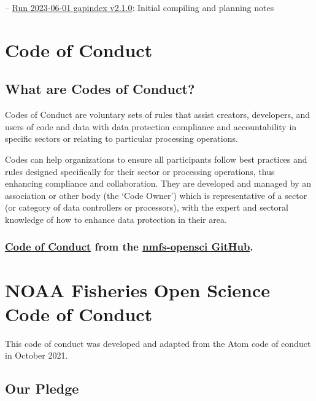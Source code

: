\documentclass[
  letterpaper,
  oneside,
  open=any]{scrbook}
\begin{document}
--
\href{https://raw.githubusercontent.com/afsc-gap-products/gap_products/main/content/intro-news/2023-06-01_v2-1-0.txt}{Run
2023-06-01 gapindex v2.1.0}: Initial compiling and planning notes

\chapter{Code of Conduct}\label{code-of-conduct}

\section{What are Codes of Conduct?}\label{what-are-codes-of-conduct}

Codes of Conduct are voluntary sets of rules that assist creators,
developers, and users of code and data with data protection compliance
and accountability in specific sectors or relating to particular
processing operations.

Codes can help organizations to ensure all participants follow best
practices and rules designed specifically for their sector or processing
operations, thus enhancing compliance and collaboration. They are
developed and managed by an association or other body (the `Code Owner')
which is representative of a sector (or category of data controllers or
processors), with the expert and sectoral knowledge of how to enhance
data protection in their area.

\subsection{\texorpdfstring{\href{https://github.com/nmfs-opensci/.github/blob/main/CODE_OF_CONDUCT.md}{Code
of Conduct} from the \href{https://nmfs-opensci.github.io/}{nmfs-opensci
GitHub}.}{Code of Conduct from the nmfs-opensci GitHub.}}\label{code-of-conduct-from-the-nmfs-opensci-github.}

\chapter{NOAA Fisheries Open Science Code of
Conduct}\label{noaa-fisheries-open-science-code-of-conduct}

This code of conduct was developed and adapted from the Atom code of
conduct in October 2021.

\section{Our Pledge}\label{our-pledge}
\end{document}
